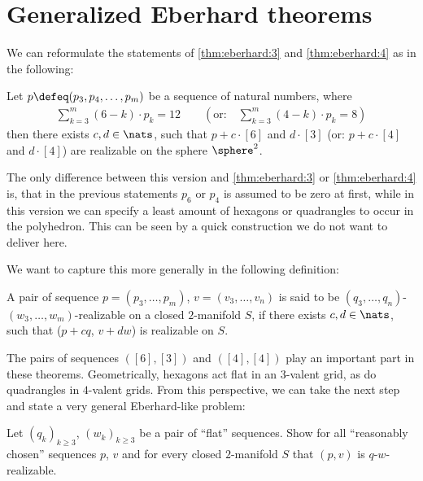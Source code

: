 \section{Generalized {\sc Eberhard} theorems}\label{sec:gen:eberhard}
We can reformulate the statements of \autoref{thm:eberhard:3} and \autoref{thm:eberhard:4} as in the following:
\begin{theorem}
  Let $p \defeq (p_3, p_4, \dots, p_m)$ be a sequence of natural numbers, where
  \begin{align*}
    \sum_{k=3}^m(6 - k) \cdot p_k = 12 \qquad \left( \text{or:}\quad \sum_{k=3}^m(4 - k) \cdot p_k = 8 \right)
  \end{align*}
  then there exists $c, d \in \nats$, such that $p + c \cdot [6]$ and $d \cdot [3]$ (or: $p + c \cdot [4]$ and $d \cdot [4]$) are realizable on the sphere $\sphere^2$.
\end{theorem}

\begin{remark}
The only difference between this version and \autoref{thm:eberhard:3} or \autoref{thm:eberhard:4} is, that in the previous statements $p_6$ or $p_4$ is assumed to be zero at first, while in this version we can specify a least amount of hexagons or quadrangles to occur in the polyhedron. This can be seen by a quick construction we do not want to deliver here. 
\end{remark}

We want to capture this more generally in the following definition:
\begin{definition}\label{def:eberhard:realizable}
  A pair of sequence $p = (p_3, \dots, p_m)$, $v = (v_3, \dots, v_n)$ is said to be $(q_3, \dots, q_n)$-$(w_3, \dots, w_m)$-realizable on a closed $2$-manifold $S$, if there exists $c, d \in \nats$, such that ($p + c q$, $v + d w$) is realizable on $S$.
\end{definition}

The pairs of sequences $([6], [3])$ and $([4], [4])$ play an important part in these theorems. Geometrically, hexagons act flat in an $3$-valent grid, as do quadrangles in $4$-valent grids. From this perspective, we can take the next step and state a very general {\sc Eberhard}-like problem:

\begin{problem}\label{prob:eberhard:unspecified}
  Let $(q_k)_{k \geq 3}$, $(w_k)_{k \geq 3}$ be a pair of ``flat'' sequences. Show for all ``reasonably chosen'' sequences $p$, $v$ and for every closed $2$-manifold $S$ that $(p, v)$ is $q$-$w$-realizable.
\end{problem}


